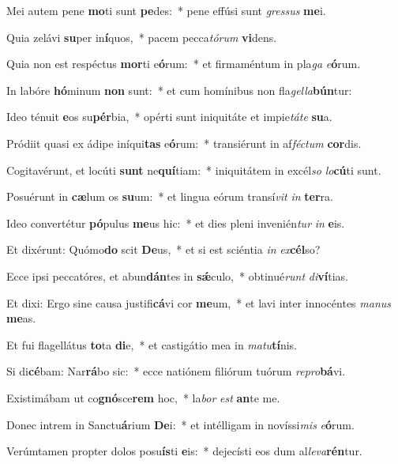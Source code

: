 \item Mei autem pene \textbf{mo}ti sunt \textbf{pe}des:~* pene effúsi sunt \textit{gres}\textit{sus} \textbf{me}i.
\item Quia zelávi \textbf{su}per in\textbf{í}quos,~* pacem pecca\textit{tó}\textit{rum} \textbf{vi}dens.
\item Quia non est respéctus \textbf{mor}ti e\textbf{ó}rum:~* et firmaméntum in pla\textit{ga} \textit{e}\textbf{ó}rum.
\item In labóre \textbf{hó}minum \textbf{non} sunt:~* et cum homínibus non fla\textit{gel}\textit{la}\textbf{bún}tur:
\item Ideo ténuit \textbf{e}os su\textbf{pér}bia,~* opérti sunt iniquitáte et impie\textit{tá}\textit{te} \textbf{su}a.
\item Pródiit quasi ex ádipe iníqui\textbf{tas} e\textbf{ó}rum:~* transiérunt in af\textit{féc}\textit{tum} \textbf{cor}dis.
\item Cogitavérunt, et locúti \textbf{sunt} ne\textbf{quí}tiam:~* iniquitátem in excél\textit{so} \textit{lo}\textbf{cú}ti sunt.
\item Posuérunt in \textbf{cæ}lum os \textbf{su}um:~* et lingua eórum transí\textit{vit} \textit{in} \textbf{ter}ra.
\item Ideo convertétur \textbf{pó}pulus \textbf{me}us hic:~* et dies pleni invenién\textit{tur} \textit{in} \textbf{e}is.
\item Et dixérunt: Quómo\textbf{do} scit \textbf{De}us,~* et si est sciéntia \textit{in} \textit{ex}\textbf{cél}so?
\item Ecce ipsi peccatóres, et abun\textbf{dán}tes in \textbf{sǽ}culo,~* obtinué\textit{runt} \textit{di}\textbf{ví}tias.
\item Et dixi: Ergo sine causa justifi\textbf{cá}vi cor \textbf{me}um,~* et lavi inter innocéntes \textit{ma}\textit{nus} \textbf{me}as.
\item Et fui flagellátus \textbf{to}ta \textbf{di}e,~* et castigátio mea in \textit{ma}\textit{tu}\textbf{tí}nis.
\item Si di\textbf{cé}bam: Nar\textbf{rá}bo sic:~* ecce natiónem filiórum tuórum \textit{re}\textit{pro}\textbf{bá}vi.
\item Existimábam ut co\textbf{gnó}sce\textbf{rem} hoc,~* la\textit{bor} \textit{est} \textbf{an}te me.
\item Donec intrem in Sanctu\textbf{á}rium \textbf{De}i:~* et intélligam in novíssi\textit{mis} \textit{e}\textbf{ó}rum.
\item Verúmtamen propter dolos posu\textbf{ís}ti \textbf{e}is:~* dejecísti eos dum al\textit{le}\textit{va}\textbf{rén}tur.
